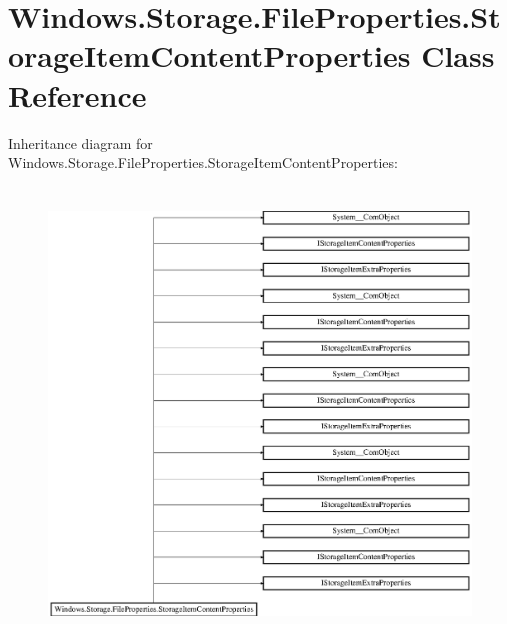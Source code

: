 \hypertarget{class_windows_1_1_storage_1_1_file_properties_1_1_storage_item_content_properties}{}\section{Windows.\+Storage.\+File\+Properties.\+Storage\+Item\+Content\+Properties Class Reference}
\label{class_windows_1_1_storage_1_1_file_properties_1_1_storage_item_content_properties}
Inheritance diagram for Windows.\+Storage.\+File\+Properties.\+Storage\+Item\+Content\+Properties\+:\begin{figure}[H]
\begin{center}
\leavevmode
\includegraphics[height=12.000000cm]{class_windows_1_1_storage_1_1_file_properties_1_1_storage_item_content_properties}
\end{center}
\end{figure}
